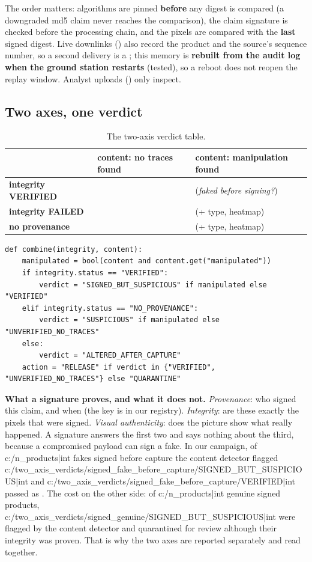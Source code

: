 The order matters: algorithms are pinned \textbf{before} any digest is compared (a downgraded md5 claim never reaches the comparison), the claim signature is checked before the processing chain, and the pixels are compared with the \textbf{last} signed digest. Live downlinks () also record the product and the source's sequence number, so a second delivery is a ; this memory is \textbf{rebuilt from the audit log when the ground station restarts} (tested), so a reboot does not reopen the replay window. Analyst uploads () only inspect.

\subsection{Two axes, one verdict}
\begin{table}[!htbp]
\centering\small
\begin{tabularx}{\textwidth}{|L{3.6cm}|Y|Y|}
\hline
 & \textbf{content: no traces found} & \textbf{content: manipulation found}\\
\hline
\textbf{integrity VERIFIED} &  &  (\emph{faked before signing?})\\
\hline
\textbf{integrity FAILED} &  &  (+ type, heatmap)\\
\hline
\textbf{no provenance} &  &  (+ type, heatmap)\\
\hline
\end{tabularx}
\caption{The two-axis verdict table.}
\end{table}
\begin{lstlisting}[style=py]
def combine(integrity, content):
    manipulated = bool(content and content.get("manipulated"))
    if integrity.status == "VERIFIED":
        verdict = "SIGNED_BUT_SUSPICIOUS" if manipulated else "VERIFIED"
    elif integrity.status == "NO_PROVENANCE":
        verdict = "SUSPICIOUS" if manipulated else "UNVERIFIED_NO_TRACES"
    else:
        verdict = "ALTERED_AFTER_CAPTURE"
    action = "RELEASE" if verdict in {"VERIFIED", "UNVERIFIED_NO_TRACES"} else "QUARANTINE"
\end{lstlisting}

\textbf{What a signature proves, and what it does not.} \emph{Provenance}: who signed this claim, and when (the key is in our registry). \emph{Integrity}: are these exactly the pixels that were signed. \emph{Visual authenticity}: does the picture show what really happened. A signature answers the first two and says nothing about the third, because a compromised payload can sign a fake. In our campaign, of {{c:/n_products|int}} fakes signed before capture the content detector flagged {{c:/two_axis_verdicts/signed_fake_before_capture/SIGNED_BUT_SUSPICIOUS|int}} and {{c:/two_axis_verdicts/signed_fake_before_capture/VERIFIED|int}} passed as . The cost on the other side: of {{c:/n_products|int}} genuine signed products, {{c:/two_axis_verdicts/signed_genuine/SIGNED_BUT_SUSPICIOUS|int}} were flagged by the content detector and quarantined for review although their integrity was proven. That is why the two axes are reported separately and read together.

